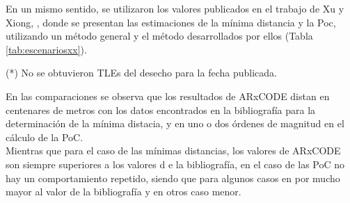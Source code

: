 En un mismo sentido, se utilizaron los valores publicados en el trabajo de Xu y  Xiong, \citep{xu2014method}, donde  se presentan las estimaciones de la m\'inima distancia y la Poc, utilizando un m\'etodo general y el m\'etodo desarrollados por ellos (Tabla \ref{tab:escenariosxx}).\\

 \begin{table}[!h]
 \caption{Comparaci\'on de ARxCODE con los resultados de  Xu \& Xiong \citep{xu2014method}.\\ Paso de propagaci\'on cien mil $\mu$s y radio de colisi\'on $r_{a}=0.01$ km.  }
\centering
{}
\begin{flushleft}\tiny{(*) No se obtuvieron TLEs del desecho para la fecha publicada.}\end{flushleft}
\label{tab:escenariosxx}
\end{table}

En las comparaciones se observa que los resultados de ARxCODE distan en centenares de metros con los datos encontrados en la bibliograf\'ia para la determinaci\'on de la m\'inima distacia, y en uno o dos \'ordenes de magnitud en el c\'alculo de la PoC.\\
Mientras que para el caso de las m\'inimas distancias, los valores de ARxCODE son siempre superiores a los valores d e la bibliograf\'ia, en el caso de las PoC no hay un comportamiento repetido, siendo que para algunos casos en por mucho mayor al valor de la bibliograf\'ia y en otros caso menor.\\ 

